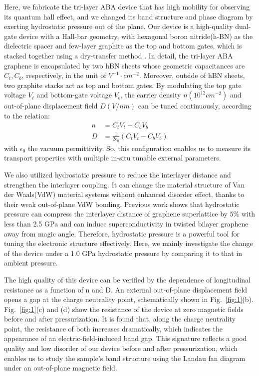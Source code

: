 
Here, we fabricate the tri-layer ABA device that has high mobility for observing its quantum hall effect, and we changed its band structure and phase diagram by exerting hydrostatic pressure out of the plane.
Our device is a high-quality dual-gate device with a Hall-bar geometry, with hexagonal boron nitride(h-BN) as the dielectric spacer and few-layer graphite as the top and bottom gates, 
which is stacked together using a dry-transfer method \cite{wang2013one}. 
In detail, the tri-layer ABA graphene is encapsulated by two hBN sheets whose geometric capacitances are $C_t, C_b$, respectively, in the unit of $V^{-1}·cm^{-2}$. 
Moreover, outside of hBN sheets, two graphite stacks act as top and bottom gates. 
By modulating the top gate voltage $V_t$ and bottom-gate voltage $V_b$, the carrier density $n(10^{12}cm^{-2})$ and out-of-plane displacement field $D(V/nm)$ can be tuned continuously, 
according to the relation:
\begin{equation}
    \begin{split}
        n &= C_t V_t + C_b V_b \\
        D &= \frac{1}{2\epsilon_0}(C_t V_t - C_b V_b)
    \end{split}
    \label{eq:nD_formula}
\end{equation}
with $\epsilon_0$ the vacuum permittivity. 
So, this configuration enables us to measure its transport properties with multiple in-situ tunable external parameters.

We also utilized hydrostatic pressure to reduce the interlayer distance and strengthen the interlayer coupling.
It can change the material structure of Van der Waals(VdW) material systems without enhanced disorder effect, thanks to their weak out-of-plane VdW bonding.
Previous work shows that hydrostatic pressure can compress the interlayer distance of graphene superlattice by $5\%$ with less than 2.5 GPa\cite{yankowitz2018dynamic} and can induce superconductivity in twisted bilayer graphene away from magic angle\cite{yankowitz2019tuning}. Therefore, hydrostatic pressure is a powerful tool for tuning the electronic structure effectively.
Here, we mainly investigate the change of the device under a 1.0 GPa hydrostatic pressure by comparing it to that in ambient pressure.

The high quality of this device can be verified by the dependence of longitudinal resistance as a function of n and D. 
An external out-of-plane displacement field opens a gap at the charge neutrality point, schematically shown in Fig.~\ref{fig:1}(b). 
Fig.~\ref{fig:1}(c) and (d) show the resistance of the device at zero magnetic fields before and after pressurization. 
It is found that, along the charge neutrality point, the resistance of both increases dramatically, which indicates the appearance of an electric-field-induced band gap. 
This signature reflects a good quality and low disorder of our device before and after pressurization, which enables us to study the sample's band structure using the Landau fan diagram 
under an out-of-plane magnetic field.

